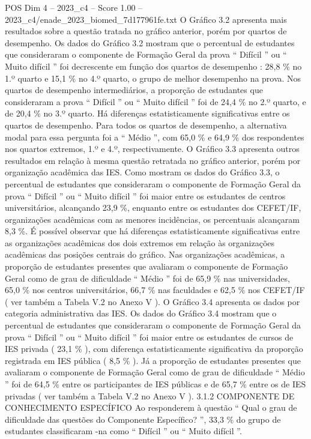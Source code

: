 \begin{textsample}{POS Dim 4 – 2023\_c4 – Score 1.00 – 2023\_c4/enade\_2023\_biomed\_7d177961fe.txt}
O Gráfico 3.2 apresenta mais resultados sobre a questão tratada no gráfico anterior, porém por quartos de desempenho.
Os dados do Gráfico 3.2 mostram que o percentual de estudantes que consideraram o componente de Formação Geral da prova “ Difícil ” ou “ Muito difícil ” foi decrescente em função dos quartos de desempenho : 28,8 \% no 1.º quarto e 15,1 \% no 4.º quarto, o grupo de melhor desempenho na prova.
Nos quartos de desempenho intermediários, a proporção de estudantes que consideraram a prova “ Difícil ” ou “ Muito difícil ” foi de 24,4 \% no 2.º quarto, e de 20,4 \% no 3.º quarto.
Há diferenças estatisticamente significativas entre os quartos de desempenho.
Para todos os quartos de desempenho, a alternativa modal para essa pergunta foi a “ Médio ”, com 65,0 \% e 64,9 \% dos respondentes nos quartos extremos, 1.º e 4.º, respectivamente.
O Gráfico 3.3 apresenta outros resultados em relação à mesma questão retratada no gráfico anterior, porém por organização acadêmica das IES.
Como mostram os dados do Gráfico 3.3, o percentual de estudantes que consideraram o componente de Formação Geral da prova “ Difícil ” ou “ Muito difícil ” foi maior entre os estudantes de centros universitários, alcançando 23,9 \%, enquanto entre os estudantes dos CEFET/IF, organizações acadêmicas com as menores incidências, os percentuais alcançaram 8,3 \%.
É possível observar que há diferenças estatisticamente significativas entre as organizações acadêmicas dos dois extremos em relação às organizações acadêmicas das posições centrais do gráfico.
Nas organizações acadêmicas, a proporção de estudantes presentes que avaliaram o componente de Formação Geral como de grau de dificuldade “ Médio ” foi de 65,9 \% nas universidades, 65,0 \% nos centros universitários, 66,7 \% nas faculdades e 62,5 \% nos CEFET/IF ( ver também a Tabela V.2 no Anexo V ).
O Gráfico 3.4 apresenta os dados por categoria administrativa das IES.
Os dados do Gráfico 3.4 mostram que o percentual de estudantes que consideraram o componente de Formação Geral da prova “ Difícil ” ou “ Muito difícil ” foi maior entre os estudantes de cursos de IES privada ( 23,1 \% ), com diferença estatisticamente significativa da proporção registrada em IES pública ( 8,5 \% ).
Já a proporção de estudantes presentes que avaliaram o componente de Formação Geral como de grau de dificuldade “ Médio ” foi de 64,5 \% entre os participantes de IES públicas e de 65,7 \% entre os de IES privadas ( ver também a Tabela V.2 no Anexo V ). 3.1.2 COMPONENTE DE CONHECIMENTO ESPECÍFICO Ao responderem à questão “ Qual o grau de dificuldade das questões do Componente Específico? ”, 33,3 \% do grupo de estudantes classificaram -na como “ Difícil ” ou “ Muito difícil ”.

\end{textsample}
